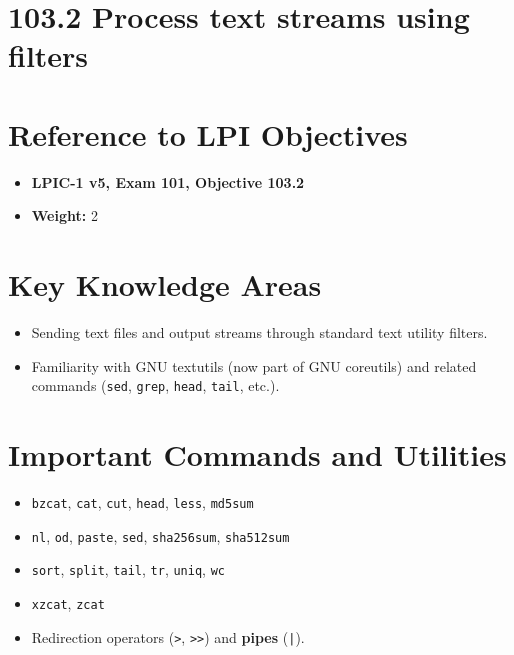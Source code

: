 \documentclass[a4paper]{report}
\begin{document}
\newpage
\section*{103.2 Process text streams using filters}

\section*{Reference to LPI Objectives}
\begin{itemize}
    \item \textbf{LPIC-1 v5, Exam 101, Objective 103.2}
    \item \textbf{Weight:} 2
\end{itemize}

\section*{Key Knowledge Areas}
\begin{itemize}
    \item Sending text files and output streams through standard text utility filters.
    \item Familiarity with GNU textutils (now part of GNU coreutils) and related commands (\texttt{sed}, \texttt{grep}, \texttt{head}, \texttt{tail}, etc.).
\end{itemize}

\section*{Important Commands and Utilities}
\begin{itemize}
    \item \texttt{bzcat}, \texttt{cat}, \texttt{cut}, \texttt{head}, \texttt{less}, \texttt{md5sum}
    \item \texttt{nl}, \texttt{od}, \texttt{paste}, \texttt{sed}, \texttt{sha256sum}, \texttt{sha512sum}
    \item \texttt{sort}, \texttt{split}, \texttt{tail}, \texttt{tr}, \texttt{uniq}, \texttt{wc}
    \item \texttt{xzcat}, \texttt{zcat}
    \item Redirection operators (\texttt{>}, \texttt{>>}) and \textbf{pipes} (\texttt{|}).
\end{itemize}
\end{document}
